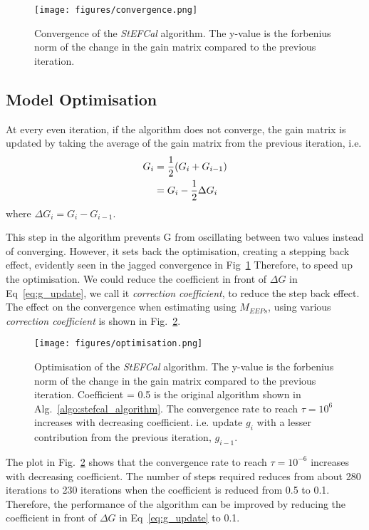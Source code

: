 \documentclass[10pt,a4paper,twocolumn]{paper}
\begin{document}
\begin{figure}[H]
    \centering
    \texttt{[image: figures/convergence.png]}
    \caption{Convergence of the \textit{StEFCal} algorithm. The y-value is the forbenius norm of the change in the gain matrix compared to the previous iteration.}
    \label{fig:convergence}
\end{figure}

\subsection{Model Optimisation}
At every even iteration, if the algorithm does not converge, the gain matrix is updated by taking the average of the gain matrix from the previous iteration, i.e.
\begin{align}
    G_i &= \frac{1}{2} (G_i + G_{i-1}) \notag\\
    &= G_i - \frac{1}{2}\Delta G_i
    \label{eq:g_update}
\end{align}
where $\Delta G_i = G_i - G_{i-1}$. 

This step in the algorithm prevents G from oscillating between two values instead of converging. However, it sets back the optimisation, creating a stepping back effect, evidently seen in the jagged convergence in Fig~\ref{fig:convergence} Therefore, to speed up the optimisation. We could reduce the coefficient in front of $\Delta G$ in Eq~\ref{eq:g_update}, we call it \textit{correction coefficient}, to reduce the step back effect.
The effect on the convergence when estimating using $M_{EEPs}$, using various \textit{correction coefficient }is shown in Fig.~\ref{fig:optimisation}.

\begin{figure}[H]
    \centering
    \texttt{[image: figures/optimisation.png]}
    \caption{Optimisation of the \textit{StEFCal} algorithm. The y-value is the forbenius norm of the change in the gain matrix compared to the previous iteration. Coefficient = 0.5 is the original algorithm shown in Alg.~\ref{algo:stefcal_algorithm}. The convergence rate to reach $\tau = 10^6$ increases with decreasing coefficient. i.e. update $g_i$ with a lesser contribution from the previous iteration, $g_{i-1}$.}
    \label{fig:optimisation}
\end{figure}

The plot in Fig.~\ref{fig:optimisation} shows that the convergence rate to reach $\tau = 10^{-6}$ increases with decreasing coefficient. The number of steps required reduces from about 280 iterations to 230 iterations when the coefficient is reduced from 0.5 to 0.1. Therefore, the performance of the algorithm can be improved by reducing the coefficient in front of $\Delta G$ in Eq~\ref{eq:g_update} to 0.1.
\end{document}
